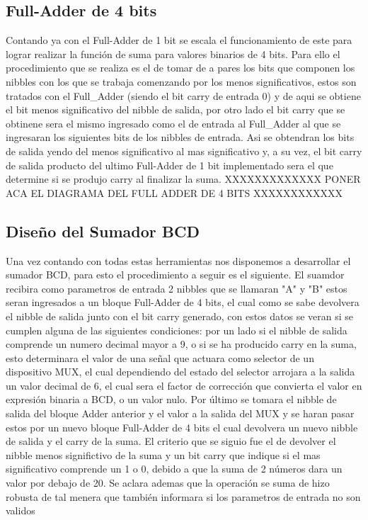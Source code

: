   \subsection{Full-Adder de 4 bits}
  Contando ya con el Full-Adder de 1 bit se escala el funcionamiento de este para lograr realizar la función de suma para valores binarios de 4 bits. Para ello el procedimiento que se realiza es el de tomar de a pares los bits que componen los nibbles con los que se trabaja comenzando por los menos significativos, estos son tratados con el Full_Adder (siendo el bit carry de entrada 0) y de aqui se obtiene el bit menos significativo del nibble de salida, por otro lado el bit carry que se obtinene sera el mismo ingresado como el de entrada al Full_Adder al que se ingresaran los siguientes bits de los nibbles de entrada. Asi se obtendran los bits de salida yendo del menos significativo al mas significativo y, a su vez, el bit carry de salida producto del ultimo Full-Adder de 1 bit implementado sera el que determine si se produjo carry al finalizar la suma.
  XXXXXXXXXXXXX PONER ACA EL DIAGRAMA DEL FULL ADDER DE 4 BITS XXXXXXXXXXXX
  \subsection{Diseño del Sumador BCD}
  Una vez contando con todas estas herramientas nos disponemos a desarrollar el sumador BCD, para esto el procedimiento a seguir es el siguiente. El suamdor recibira como parametros de entrada 2 nibbles que se llamaran "A" y "B" estos seran ingresados a un bloque Full-Adder de 4 bits, el cual como se sabe devolvera el nibble de salida junto con el bit carry generado, con estos datos se veran si se cumplen alguna de las siguientes condiciones: por un lado si el nibble de salida comprende un numero decimal mayor a 9, o si se ha producido carry en la suma, esto determinara el valor de una señal que actuara como selector de un dispositivo MUX, el cual dependiendo del estado del selector arrojara a la salida un valor decimal de 6, el cual sera el factor de corrección que convierta el valor en expresión binaria a BCD,  o un valor nulo. Por último se tomara el nibble de salida del bloque Adder anterior y el valor a la salida del MUX y se haran pasar estos por un nuevo bloque Full-Adder de 4 bits el cual devolvera un nuevo nibble de salida y el carry de la suma. El criterio que se siguio fue el de devolver el nibble menos significtivo de la suma y un bit carry que indique si el mas significativo comprende un 1 o 0, debido a que la suma de 2 números dara un valor por debajo de 20. Se aclara ademas que la operación se suma de hizo robusta de tal menera que también informara si los parametros de entrada no son validos
